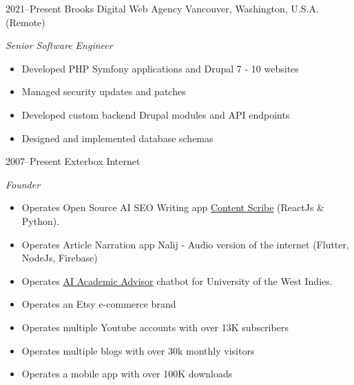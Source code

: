 \documentclass[]{friggeri-cv} %
\begin{document}
\begin{entrylist}

\entry
{2021--Present}
{Brooks Digital Web Agency}
{Vancouver, Washington, U.S.A. (Remote)}
{\emph{Senior Software Engineer}
\begin{itemize}
\item Developed PHP Symfony applications and Drupal 7 - 10 websites
\item Managed security updates and patches
\item Developed custom backend Drupal modules and API endpoints
\item Designed and implemented database schemas
\end{itemize}}

\entry
{2007--Present}
{Exterbox}
{Internet}
{\emph{Founder}
\begin{itemize}
\item Operates Open Source AI SEO Writing app \href{https://contentscibe.net}{Content Scribe} (ReactJs \& Python).
\item Operates Article Narration app Nalij - Audio version of the internet (Flutter, NodeJs, Firebase)
\item Operates \href{https://uwi.edu/academic-advisor.php}{AI Academic Advisor} chatbot for University of the West Indies.
\item Operates an Etsy e-commerce brand
\item Operates multiple Youtube accounts with over 13K subscribers
\item Operates multiple blogs with over 30k monthly visitors
\item Operates a mobile app with over 100K downloads
\end{itemize}}



\end{entrylist}
\end{document}
